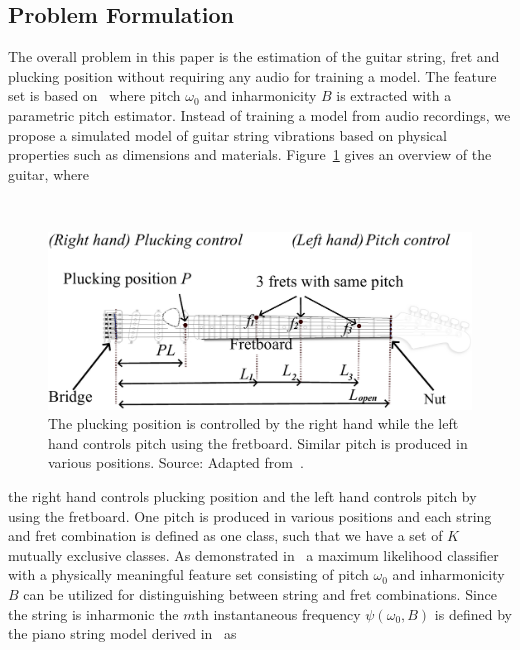 \documentclass{article}
\begin{document}
\begin{sloppy}

\section{Problem Formulation}
The overall problem in this paper is the estimation of the guitar string, fret and plucking position without requiring any audio for training a model. The feature set is based on~\cite{hjerrild::icassp19} where pitch $\omega_0$ and inharmonicity $B$ is extracted with a parametric pitch estimator.  Instead of training a model from audio recordings, we propose a simulated model of guitar string vibrations based on physical properties such as dimensions and materials. Figure~\ref{fig:guitar_overview} gives an overview of the guitar, where 
\begin{figure}[h!]\
  \centering
  \centerline{\includegraphics[width=1\columnwidth]{img/fender_drawing4.png}}
  \caption{The plucking position is controlled by the right hand while the left hand controls pitch using the fretboard. Similar pitch is produced in various positions. Source: Adapted from~\cite{phillips}.
  }\label{fig:guitar_overview}\vspace{-2mm}
\end{figure}
%
the right hand controls plucking position and the left hand controls pitch by using the fretboard. One pitch is produced in various positions and each string and fret combination is defined as one class, such that we have a set of $K$ mutually exclusive classes. 
%
%
%
% 
As demonstrated in~\cite{hjerrild::icassp19} a maximum likelihood classifier with a physically meaningful feature set consisting of pitch $\omega_0$ and inharmonicity $B$ can be utilized for distinguishing between string and fret combinations. 
Since the string is inharmonic the $m$th instantaneous frequency $\psi(\omega_0,B)$ is defined by the piano string model derived in~\cite{fletcher:piano_model} as 

\end{sloppy}
\end{document}
